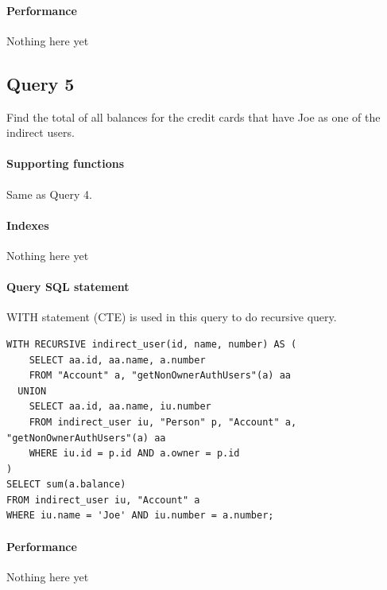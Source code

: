 \documentclass[11pt]{article}
\begin{document}
\paragraph{Performance} Nothing here yet

\subsection{Query 5}
Find the total of all balances for the credit cards that have Joe as one of the indirect users.

\paragraph{Supporting functions} Same as Query 4.

\paragraph{Indexes} Nothing here yet

\paragraph{Query SQL statement} WITH statement (CTE) is used in this query to do recursive query.
\begin{verbatim}
WITH RECURSIVE indirect_user(id, name, number) AS (
    SELECT aa.id, aa.name, a.number
    FROM "Account" a, "getNonOwnerAuthUsers"(a) aa
  UNION
    SELECT aa.id, aa.name, iu.number
    FROM indirect_user iu, "Person" p, "Account" a, "getNonOwnerAuthUsers"(a) aa
    WHERE iu.id = p.id AND a.owner = p.id
)
SELECT sum(a.balance)
FROM indirect_user iu, "Account" a
WHERE iu.name = 'Joe' AND iu.number = a.number;
\end{verbatim}

\paragraph{Performance} Nothing here yet
\end{document}
